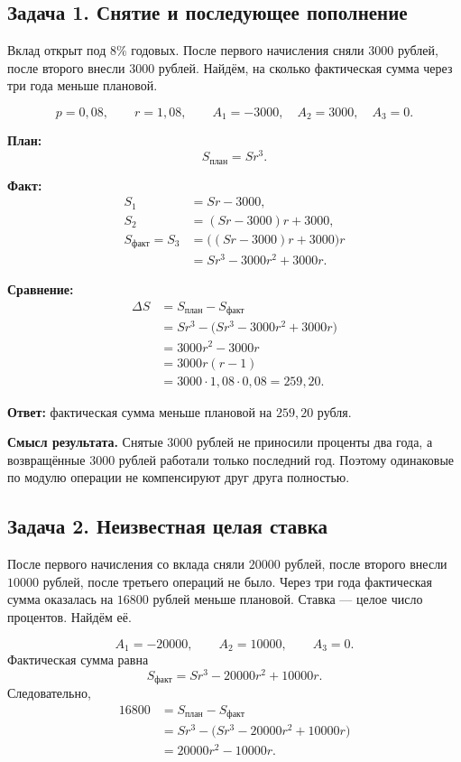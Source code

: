 \documentclass[a4paper,12pt]{article}
\newcommand{\term}[1]{\textcolor{darkaccent}{\textbf{#1}}}
\begin{document}
\subsection{Задача 1. Снятие и последующее пополнение}

Вклад открыт под $8\%$ годовых. После первого начисления сняли
$3000$ рублей, после второго внесли $3000$ рублей. Найдём, на сколько
фактическая сумма через три года меньше плановой.

\[
p=0{,}08,\qquad r=1{,}08,\qquad
A_1=-3000,\quad A_2=3000,\quad A_3=0.
\]

\term{План:}
\[
S_{\text{план}}=Sr^3.
\]

\term{Факт:}
\begin{align*}
S_1&=Sr-3000,\\
S_2&=(Sr-3000)r+3000,\\
S_{\text{факт}}=S_3&=\bigl((Sr-3000)r+3000\bigr)r\\
&=Sr^3-3000r^2+3000r.
\end{align*}

\term{Сравнение:}
\begin{align*}
\Delta S
&=S_{\text{план}}-S_{\text{факт}}\\
&=Sr^3-\bigl(Sr^3-3000r^2+3000r\bigr)\\
&=3000r^2-3000r\\
&=3000r(r-1)\\
&=3000\cdot1{,}08\cdot0{,}08=259{,}20.
\end{align*}

\term{Ответ:} фактическая сумма меньше плановой на $259{,}20$ рубля.

\term{Смысл результата.} Снятые $3000$ рублей не приносили проценты два года,
а возвращённые $3000$ рублей работали только последний год. Поэтому одинаковые
по модулю операции не компенсируют друг друга полностью.

\subsection{Задача 2. Неизвестная целая ставка}

После первого начисления со вклада сняли $20000$ рублей, после второго внесли
$10000$ рублей, после третьего операций не было. Через три года фактическая
сумма оказалась на $16800$ рублей меньше плановой. Ставка --- целое число
процентов. Найдём её.

\[
A_1=-20000,\qquad A_2=10000,\qquad A_3=0.
\]
Фактическая сумма равна
\[
S_{\text{факт}}=Sr^3-20000r^2+10000r.
\]
Следовательно,
\begin{align*}
16800
&=S_{\text{план}}-S_{\text{факт}}\\
&=Sr^3-\bigl(Sr^3-20000r^2+10000r\bigr)\\
&=20000r^2-10000r.
\end{align*}
\end{document}

